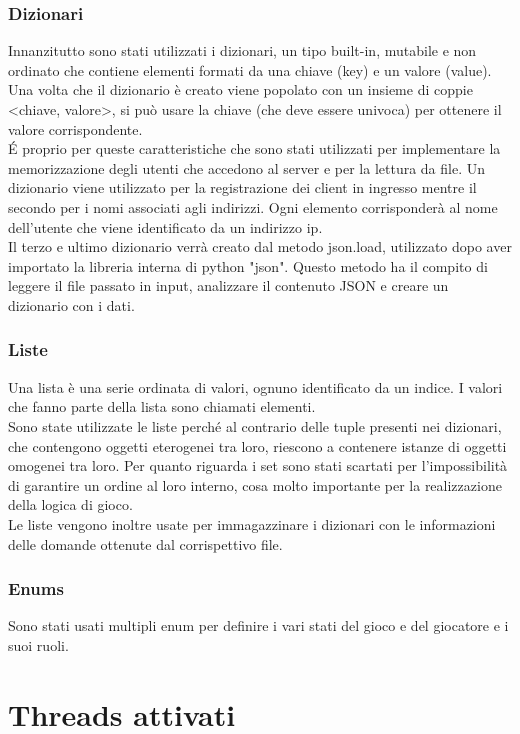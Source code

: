 \documentclass[a4paper,12pt]{report}
\begin{document}
\subsection{Dizionari}
Innanzitutto sono stati utilizzati i dizionari, un tipo built-in, mutabile e non ordinato che contiene elementi formati da una chiave (key) e un valore (value). Una volta che il dizionario è creato viene popolato con un insieme di coppie <chiave, valore>, si può usare la chiave (che deve essere univoca) per ottenere il valore corrispondente.\\
É proprio per queste caratteristiche che sono stati utilizzati per implementare la memorizzazione degli utenti che accedono al server e per la lettura da file. Un dizionario viene utilizzato per la registrazione dei client in ingresso mentre il secondo per i nomi associati agli indirizzi. Ogni elemento corrisponderà al nome dell'utente che viene identificato da un indirizzo ip.\\
Il terzo e ultimo dizionario verrà creato dal metodo json.load, utilizzato dopo aver importato la libreria interna di python "json".
Questo metodo ha il compito di leggere il file passato in input, analizzare il contenuto JSON e creare un dizionario con i dati.\clearpage
 
\subsection{Liste} 
Una lista è una serie ordinata di valori, ognuno identificato da un indice. I valori che fanno parte della lista sono chiamati elementi.\\
Sono state utilizzate le liste perché al contrario delle tuple presenti nei dizionari, che contengono oggetti eterogenei tra loro, riescono a contenere istanze di oggetti omogenei tra loro. Per quanto riguarda i set sono stati scartati per l'impossibilità di garantire un ordine al loro interno, cosa molto importante per la realizzazione della logica di gioco.\\
Le liste vengono inoltre usate per immagazzinare i dizionari con le informazioni delle domande ottenute dal corrispettivo file.

\subsection{Enums}
Sono stati usati multipli enum per definire i vari stati del gioco e del giocatore e i suoi ruoli.

\chapter{Threads attivati}
\end{document}
